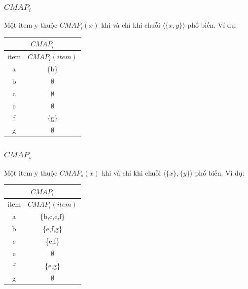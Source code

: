 \documentclass[a4paper 14pt]{article}
\begin{document}
			\subsubsection{$CMAP_i$}
				Một item y thuộc $CMAP_i(x)$ khi và chỉ khi chuỗi $\langle \{x,y\} \rangle$ phổ biến. Ví dụ:
				\begin{table}[H]
						\begin{tabular}{| c | c |}
						\hline
						\multicolumn{2}{|c|}{$CMAP_i$}\\ \hline
						item & $CMAP_i(item)$\\ \hline
						a & \{b\} \\ \hline
						b & $\emptyset$ \\ \hline
						c & $\emptyset$ \\ \hline
						e & $\emptyset$ \\ \hline
						f & \{g\} \\ \hline
						g & $\emptyset$ \\ \hline
						\end{tabular}
				\end{table}
			\subsubsection{$CMAP_s$}
				Một item y thuộc $CMAP_s(x)$ khi và chỉ khi chuỗi $\langle \{x\}, \{y\} \rangle$ phổ biến. Ví dụ:
				\begin{table}[H]
					\begin{tabular}{| c | c |}
						\hline
						\multicolumn{2}{|c|}{$CMAP_i$}\\ \hline
						item & $CMAP_i(item)$\\ \hline
						a & \{b,c,e,f\} \\ \hline
						b & \{e,f,g\} \\ \hline
						c & \{e,f\} \\ \hline
						e & $\emptyset$ \\ \hline
						f & \{e,g\} \\ \hline
						g & $\emptyset$ \\ \hline
					\end{tabular}
				\end{table}
\end{document}
